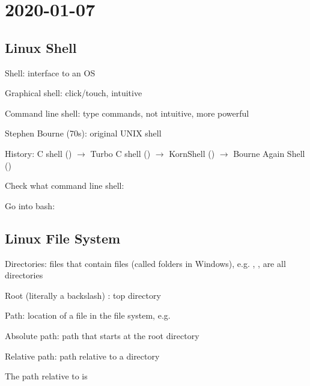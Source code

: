 \section{2020-01-07}

\subsection{Linux Shell}

Shell: interface to an OS

Graphical shell: click/touch, intuitive

Command line shell: type commands, not intuitive, more powerful

Stephen Bourne (70s): original UNIX shell

History: C shell () $ \rightarrow $ Turbo C shell () $ \rightarrow $ 
KornShell () $ \rightarrow $ Bourne Again Shell ()

Check what command line shell: 

Go into bash: 

\subsection{Linux File System}
Directories: files that contain files (called folders in Windows), e.g.
, ,  are all directories

Root (literally a backslash) \code{/}: top directory

Path: location of a file in the file system, e.g. 

Absolute path: path that starts at the root directory

Relative path: path relative to a directory

The path 
relative to  is 

